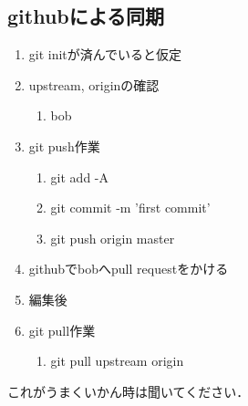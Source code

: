 \subsection{githubによる同期}\begin{enumerate}
\item git initが済んでいると仮定
\item upstream, originの確認\begin{enumerate}
\item bob%
\end{enumerate}
\item git push作業\begin{enumerate}
\item git add -A
\item git commit -m 'first commit'
\item git push origin master
\end{enumerate}
\item githubでbobへpull requestをかける
\item 編集後
\item git pull作業\begin{enumerate}
\item git pull upstream origin
\end{enumerate}
\end{enumerate}
これがうまくいかん時は聞いてください．

